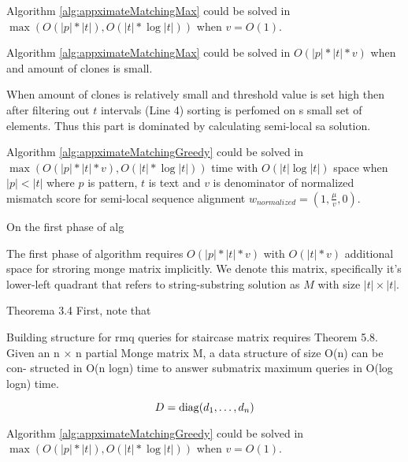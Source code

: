\begin{corollary}
Algorithm \ref{alg:appximateMatchingMax} could  be solved in 
$\max ( O(|p| * |t|), O(|t| * \log |t|))$ when $v = O(1)$.
\end{corollary}

\begin{corollary}
Algorithm \ref{alg:appximateMatchingMax} could  be solved in 
$ O(|p| * |t| * v )$ when  and amount of clones is small.

When amount of clones is relatively small and threshold value is set high  then after filtering out $t$ intervals (Line 4) sorting is perfomed on s small set of elements.
Thus this part is dominated by calculating semi-local sa solution.
\end{corollary}




\begin{theorem}
Algorithm \ref{alg:appximateMatchingGreedy} could  be solved in 
$\max ( O(|p| * |t| * v), O(|t| * \log |t|))$ time with $ O(|t| \log |t|)$ space when $|p|<|t|$ where $p$ is pattern, $t$ is text and $v$ is denominator of normalized mismatch score for semi-local sequence alignment
$w_{normalized} = (1,\frac{\mu}{v},0)$.

On the first phase of alg

The first phase of algorithm requires $O(|p| * |t| * v)$ with $O(|t| * v)$ additional space for stroring monge matrix implicitly.
We denote this matrix, specifically it's lower-left quadrant that refers to
string-substring solution as $M$ with size $|t| \times |t|$.


  Theorema 3.4
First, note that 

Building structure for rmq queries for staircase matrix requires 
Theorem 5.8. Given an n × n partial Monge matrix M, a data structure of size O(n) can be con-
structed in O(n logn) time to answer submatrix maximum queries in O(log logn) time.
   

\begin{displaymath}
    D = \operatorname{diag}(d_1,\dots,d_n)
  \end{displaymath}
\end{theorem}


\begin{corollary}
Algorithm \ref{alg:appximateMatchingGreedy} could  be solved in 
$\max ( O(|p| * |t|), O(|t| * \log |t|))$ when $v = O(1)$.

\end{corollary}




  


 
